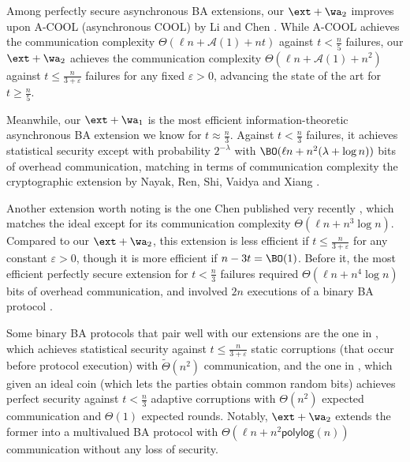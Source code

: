 Among perfectly secure asynchronous BA extensions, our $\ext + \wa_2$ improves upon A-COOL (asynchronous COOL) by Li and Chen \cite{lichen21}. While A-COOL achieves the communication complexity $\Theta(\ell n + \mathcal{A}(1) + nt)$ against $t < \frac{n}{5}$ failures, our $\ext + \wa_2$ achieves the communication complexity $\Theta(\ell n + \mathcal{A}(1) + n^2)$ against $t \leq \frac{n}{3 + \varepsilon}$ failures for any fixed $\varepsilon > 0$, advancing the state of the art \nolinebreak for \nolinebreak $t \geq \frac{n}{5}$. 

Meanwhile, our $\ext + \wa_1$ is the most efficient information-theoretic asynchronous BA extension we know for $t \approx \frac{n}{3}$. Against $t < \frac{n}{3}$ failures, it achieves statistical security except with probability $2^{-\lambda}$ with $\BO(\ell n + n^2(\lambda + \log n))$ bits of overhead communication, matching in terms of communication complexity the cryptographic extension by Nayak, Ren, Shi, Vaidya and Xiang \cite{nayak20}.

Another extension worth noting is the one Chen published very recently \cite{chen25}, which matches the ideal except for its communication complexity $\Theta(\ell n + n^3\log n)$. Compared to our $\ext + \wa_2$, this extension is less efficient if $t \leq \frac{n}{3 + \varepsilon}$ for any constant $\varepsilon > 0$, though it is more efficient if $n - 3t = \BO(1)$. Before it, the most efficient perfectly secure extension for $t < \frac{n}{3}$ failures required $\Theta(\ell n + n^4\log n)$ bits of overhead communication, and involved $2n$ executions of a binary BA protocol \cite{nayak20}.

Some binary BA protocols that pair well with our extensions are the one in \cite{kkkss10}, which achieves statistical security against $t \leq \frac{n}{3 + \varepsilon}$  static corruptions (that occur before protocol execution) with $\widetilde{\Theta}(n^2)$ communication, and the one in \cite{mmr15}, which given an ideal coin (which lets the parties obtain common random bits) achieves perfect security against $t < \frac{n}{3}$ adaptive corruptions with $\Theta(n^2)$ expected communication and $\Theta(1)$ expected rounds. Notably, $\ext + \wa_2$ extends the former into a multivalued BA protocol with $\Theta(\ell n + n^2\mathsf{polylog}(n))$ communication without any loss of security.